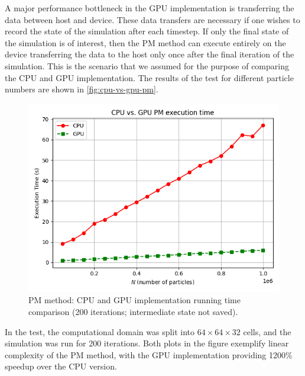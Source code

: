 A major performance bottleneck in the GPU implementation is transferring the data between host and device.
These data transfers are necessary if one wishes to record the state of the simulation after each timestep.
If only the final state of the simulation is of interest, then the PM method can execute entirely on the device transferring the data to the host only once after the final iteration of the simulation.
This is the scenario that we assumed for the purpose of comparing the CPU and GPU implementation.
The results of the test for different particle numbers are shown in \autoref{fig:cpu-vs-gpu-pm}.
\begin{figure}[htp]
    \centering
    \includegraphics[scale=0.6]{chapters/pm-method/img/cpu-vs-gpu.png}
    \caption{PM method: CPU and GPU implementation running time comparison (200 iterations; intermediate state not saved).}
    \label{fig:cpu-vs-gpu-pm}
\end{figure}
In the test, the computational domain was split into $64\times 64 \times 32$ cells, and the simulation was run for 200 iterations.
Both plots in the figure exemplify linear complexity of the PM method, with the GPU implementation providing 1200\% speedup over the CPU version.